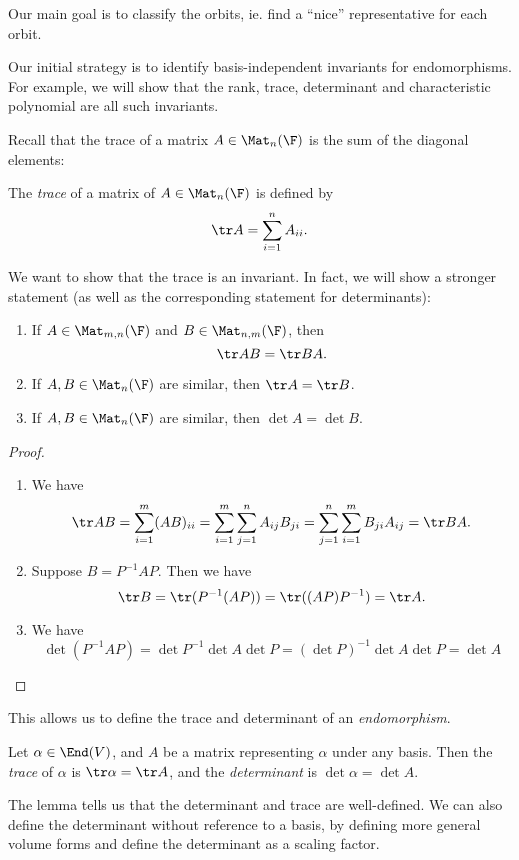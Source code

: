\documentclass[a4paper]{article}
\begin{document}
Our main goal is to classify the orbits, ie. find a ``nice'' representative for each orbit.

Our initial strategy is to identify basis-independent invariants for endomorphisms. For example, we will show that the rank, trace, determinant and characteristic polynomial are all such invariants.

Recall that the trace of a matrix $A \in \Mat_n(\F)$ is the sum of the diagonal elements:
\begin{defi}[Trace]
  The \emph{trace} of a matrix of $A \in \Mat_n(\F)$ is defined by
  \[
    \tr A = \sum_{i = 1}^n A_{ii}.
  \]
\end{defi}

We want to show that the trace is an invariant. In fact, we will show a stronger statement (as well as the corresponding statement for determinants):
\begin{lemma}\leavevmode
  \begin{enumerate}
    \item If $A \in \Mat_{m, n}(\F)$ and $B\in \Mat_{n, m}(\F)$, then
      \[
        \tr AB = \tr BA.
      \]
    \item If $A, B \in \Mat_n(\F)$ are similar, then $\tr A = \tr B$.
    \item If $A, B \in \Mat_n(\F)$ are similar, then $\det A = \det B$.
  \end{enumerate}
\end{lemma}

\begin{proof}\leavevmode
  \begin{enumerate}
    \item We have
      \[
        \tr AB = \sum_{i = 1}^m (AB)_{ii} = \sum_{i = 1}^m \sum_{j = 1}^n A_{ij}B_{ji} = \sum_{j = 1}^n \sum_{i = 1}^m B_{ji}A_{ij} = \tr BA.
      \]
    \item Suppose $B = P^{-1}AP$. Then we have
      \[
        \tr B = \tr (P^{-1}(AP)) = \tr ((AP)P^{-1}) = \tr A.
      \]
    \item We have
      \[
        \det (P^{-1}AP) = \det P^{-1} \det A \det P = (\det P)^{-1} \det A \det P = \det A
      \]
  \end{enumerate}
\end{proof}
This allows us to define the trace and determinant of an \emph{endomorphism}.
\begin{defi}
  Let $\alpha \in \End(V)$, and $A$ be a matrix representing $\alpha$ under any basis. Then the \emph{trace} of $\alpha$ is $\tr \alpha = \tr A$, and the \emph{determinant} is $\det \alpha = \det A$.
\end{defi}
The lemma tells us that the determinant and trace are well-defined. We can also define the determinant without reference to a basis, by defining more general volume forms and define the determinant as a scaling factor.
\end{document}
